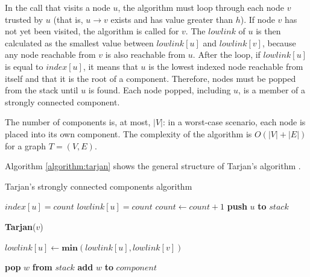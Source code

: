 In the call that visits a node $u$, the algorithm must loop through each node $v$ trusted by $u$ (that is, $u \rightarrow v$ exists and has value greater than $h$).
If node $v$ has not yet been visited, the algorithm is called for $v$.
The $lowlink$ of $u$ is then calculated as the smallest value between $lowlink[u]$ and $lowlink[v]$, because any node reachable from $v$ is also reachable from $u$.
After the loop, if $lowlink[u]$ is equal to $index[u]$, it means that $u$ is the lowest indexed node reachable from itself and that it is the root of a component.
Therefore, nodes must be popped from the stack until $u$ is found.
Each node popped, including $u$, is a member of a strongly connected component.

The number of components is, at most, $|V|$: in a worst-case scenario, each node is placed into its own component.
The complexity of the algorithm is $O(|V|+|E|)$ for a graph $T = (V,E)$.

Algorithm \autoref{algorithm:tarjan} shows the general structure of Tarjan's algorithm  \cite{tarjan1972depth}.

\begin{algorithm}
\caption{Tarjan's strongly connected components algorithm}\label{algorithm:tarjan}
\begin{algorithmic}[1]


\State $index[u] = count$
\State $lowlink[u] = count$
\State $count \gets count + 1$
\State \textbf{push} $u$ \textbf{to} $stack$

	
		\State \textbf{Tarjan}($v$)
	\EndIf
	
	\State $lowlink[u] \gets \textbf{min}(lowlink[u],lowlink[v])$
\EndFor

	\Repeat
		\State \textbf{pop} $w$ \textbf{from} $stack$
		\State \textbf{add} $w$ \textbf{to} $component$
\EndIf

\EndFunction
\end{algorithmic}
\end{algorithm}


